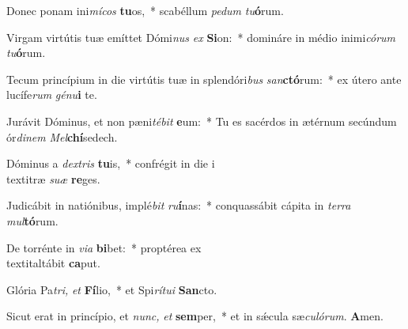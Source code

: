 \item Donec ponam ini\textit{mícos} \textbf{tu}os,~* scabéllum \textit{pedum} \textit{tu}\textbf{ó}rum.
\item Virgam virtútis tuæ emíttet Dómi\textit{nus} \textit{ex} \textbf{Si}on:~* domináre in médio inimi\hspace*{0.03em}\textit{córum} \textit{tu}\textbf{ó}rum.
\item Tecum princípium in die virtútis tuæ in splendóri\textit{bus} \textit{san}\textbf{ctó}rum:~* ex útero ante lucífe\textit{rum} \textit{génu}\textbf{i} te.
\item Jurávit Dóminus, et non pæni\hspace*{0.03em}\textit{tébit} \textbf{e}um:~* Tu es sacérdos in ætérnum secúndum ór\textit{dinem} \textit{Mel}\textbf{chí}sedech.
\item Dóminus a \textit{dextris} \textbf{tu}is,~* confrégit in die i\hspace*{0.03em}\\textit{ræ} \textit{suæ} \textbf{re}ges.
\item Judicábit in natiónibus, implé\textit{bit} \textit{ru}\textbf{í}nas:~* conquassábit cápita in \textit{terra} \textit{mul}\textbf{tó}rum.
\item De torrénte in \textit{via} \textbf{bi}bet:~* proptérea ex\hspace*{0.03em}\\textit{altábit} \textbf{ca}put.
\item Glória Pa\hspace*{0.03em}\textit{tri,} \textit{et} \textbf{Fí}lio,~* et Spi\textit{rítui} \textbf{San}cto.
\item Sicut erat in princípio, et \textit{nunc,} \textit{et} \textbf{sem}per,~* et in sǽcula sæ\textit{culórum}. \textbf{A}men.